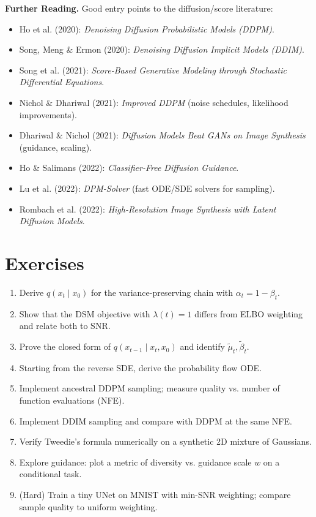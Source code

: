 \begin{pausebox}
\textbf{Further Reading.} Good entry points to the diffusion/score literature:
\begin{itemize}
\item Ho et al. (2020): \emph{Denoising Diffusion Probabilistic Models (DDPM)}.
\item Song, Meng \& Ermon (2020): \emph{Denoising Diffusion Implicit Models (DDIM)}.
\item Song et al. (2021): \emph{Score-Based Generative Modeling through Stochastic Differential Equations}.
\item Nichol \& Dhariwal (2021): \emph{Improved DDPM} (noise schedules, likelihood improvements).
\item Dhariwal \& Nichol (2021): \emph{Diffusion Models Beat GANs on Image Synthesis} (guidance, scaling).
\item Ho \& Salimans (2022): \emph{Classifier-Free Diffusion Guidance}.
\item Lu et al. (2022): \emph{DPM-Solver} (fast ODE/SDE solvers for sampling).
\item Rombach et al. (2022): \emph{High-Resolution Image Synthesis with Latent Diffusion Models}.
\end{itemize}
\end{pausebox}

\vspSection

\section*{Exercises}
\begin{enumerate}
\item Derive $q(x_t\mid x_0)$ for the variance-preserving chain with $\alpha_t=1-\beta_t$.
\item Show that the DSM objective with $\lambda(t)=1$ differs from ELBO weighting and relate both to SNR.
\item Prove the closed form of $q(x_{t-1}\mid x_t,x_0)$ and identify $\tilde{\mu}_t,\tilde{\beta}_t$.
\item Starting from the reverse SDE, derive the probability flow ODE.
\item Implement ancestral DDPM sampling; measure quality vs. number of function evaluations (NFE).
\item Implement DDIM sampling and compare with DDPM at the same NFE.
\item Verify Tweedie's formula numerically on a synthetic 2D mixture of Gaussians.
\item Explore guidance: plot a metric of diversity vs. guidance scale $w$ on a conditional task.
\item (Hard) Train a tiny UNet on MNIST with min-SNR weighting; compare sample quality to uniform weighting.
\end{enumerate}

\vspChapter
